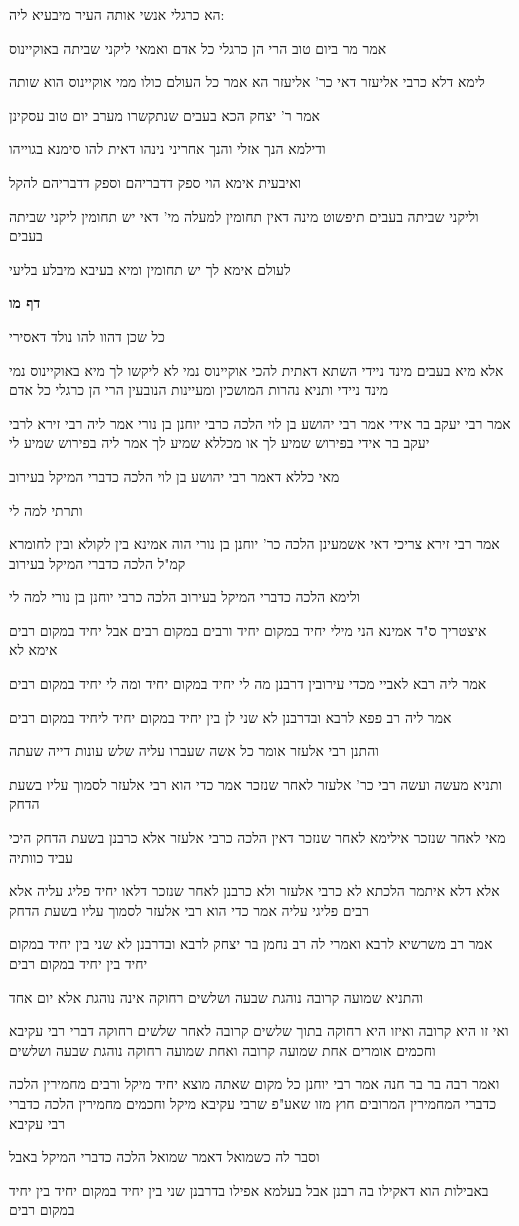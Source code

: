 \documentclass[12pt, openany]{book}
\newcommand{\sethebfont}{
\fontsize{10.5pt}{21.0pt} \selectfont
}
\newcommand{\textblock}[1]{
{\sethebfont #1\\}	
}
\newcommand{\sectname}{}
\newcommand{\newsection}[1]{
	\addcontentsline{toc}{section}{#1}
	\renewcommand{\sectname}{#1}	
	\vspace{-\baselineskip}
	\begin{center}
		\textbf{%
\fontsize{16pt}{16pt}\selectfont
			#1}
	\end{center}
	\vspace{-\baselineskip}
	\nopagebreak
}
\begin{document}
\textblock{הא כרגלי אנשי אותה העיר מיבעיא ליה:}
\textblock{אמר מר ביום טוב הרי הן כרגלי כל אדם ואמאי ליקני שביתה באוקיינוס}
\textblock{לימא דלא כרבי אליעזר דאי כר' אליעזר הא אמר כל העולם כולו ממי אוקיינוס הוא שותה}
\textblock{אמר ר' יצחק הכא בעבים שנתקשרו מערב יום טוב עסקינן}
\textblock{ודילמא הנך אזלי והנך אחריני נינהו דאית להו סימנא בגוייהו}
\textblock{ואיבעית אימא הוי ספק דדבריהם וספק דדבריהם להקל}
\textblock{וליקני שביתה בעבים תיפשוט מינה דאין תחומין למעלה מי' דאי יש תחומין ליקני שביתה בעבים}
\textblock{לעולם אימא לך יש תחומין ומיא בעיבא מיבלע בליעי}
\newsection{דף מו}
\textblock{כל שכן דהוו להו נולד דאסירי}
\textblock{אלא מיא בעבים מינד ניידי השתא דאתית להכי אוקיינוס נמי לא ליקשו לך מיא באוקיינוס נמי מינד ניידי ותניא נהרות המושכין ומעיינות הנובעין הרי הן כרגלי כל אדם}
\textblock{אמר רבי יעקב בר אידי אמר רבי יהושע בן לוי הלכה כרבי יוחנן בן נורי אמר ליה רבי זירא לרבי יעקב בר אידי בפירוש שמיע לך או מכללא שמיע לך אמר ליה בפירוש שמיע לי}
\textblock{מאי כללא דאמר רבי יהושע בן לוי הלכה כדברי המיקל בעירוב}
\textblock{ותרתי למה לי}
\textblock{אמר רבי זירא צריכי דאי אשמעינן הלכה כר' יוחנן בן נורי הוה אמינא בין לקולא ובין לחומרא קמ"ל הלכה כדברי המיקל בעירוב}
\textblock{ולימא הלכה כדברי המיקל בעירוב הלכה כרבי יוחנן בן נורי למה לי}
\textblock{איצטריך ס"ד אמינא הני מילי יחיד במקום יחיד ורבים במקום רבים אבל יחיד במקום רבים אימא לא}
\textblock{אמר ליה רבא לאביי מכדי עירובין דרבנן מה לי יחיד במקום יחיד ומה לי יחיד במקום רבים}
\textblock{אמר ליה רב פפא לרבא ובדרבנן לא שני לן בין יחיד במקום יחיד ליחיד במקום רבים}
\textblock{והתנן רבי אלעזר אומר כל אשה שעברו עליה שלש עונות דייה שעתה}
\textblock{ותניא מעשה ועשה רבי כר' אלעזר לאחר שנזכר אמר כדי הוא רבי אלעזר לסמוך עליו בשעת הדחק}
\textblock{מאי לאחר שנזכר אילימא לאחר שנזכר דאין הלכה כרבי אלעזר אלא כרבנן בשעת הדחק היכי עביד כוותיה}
\textblock{אלא דלא איתמר הלכתא לא כרבי אלעזר ולא כרבנן לאחר שנזכר דלאו יחיד פליג עליה אלא רבים פליגי עליה אמר כדי הוא רבי אלעזר לסמוך עליו בשעת הדחק}
\textblock{אמר רב משרשיא לרבא ואמרי לה רב נחמן בר יצחק לרבא ובדרבנן לא שני בין יחיד במקום יחיד בין יחיד במקום רבים}
\textblock{והתניא שמועה קרובה נוהגת שבעה ושלשים רחוקה אינה נוהגת אלא יום אחד}
\textblock{ואי זו היא קרובה ואיזו היא רחוקה בתוך שלשים קרובה לאחר שלשים רחוקה דברי רבי עקיבא וחכמים אומרים אחת שמועה קרובה ואחת שמועה רחוקה נוהגת שבעה ושלשים}
\textblock{ואמר רבה בר בר חנה אמר רבי יוחנן כל מקום שאתה מוצא יחיד מיקל ורבים מחמירין הלכה כדברי המחמירין המרובים חוץ מזו שאע"פ שרבי עקיבא מיקל וחכמים מחמירין הלכה כדברי רבי עקיבא}
\textblock{וסבר לה כשמואל דאמר שמואל הלכה כדברי המיקל באבל}
\textblock{באבילות הוא דאקילו בה רבנן אבל בעלמא אפילו בדרבנן שני בין יחיד במקום יחיד בין יחיד במקום רבים}
\end{document}
